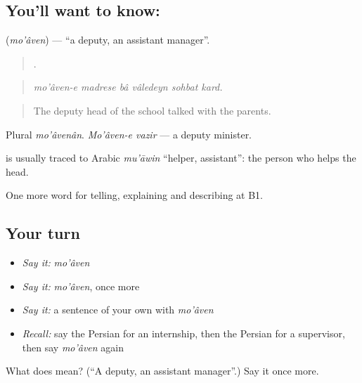 \subsection*{You'll want to know: }
\textbf{} (\emph{mo'âven}) — \textquotedblleft{}a deputy, an assistant manager\textquotedblright{}.

\begin{quote}
     .
\end{quote}

\begin{quote}
\emph{mo'âven-e madrese bâ vâledeyn sohbat kard.}
\end{quote}

\begin{quote}
The deputy head of the school talked with the parents.
\end{quote}

Plural \emph{mo'âvenân}. \emph{Mo'âven-e vazir} — a deputy minister.

\begin{cousinweb}
\textbf{} is usually traced to Arabic \emph{mu'āwin} \textquotedblleft{}helper, assistant\textquotedblright{}: the person who helps the head.
\end{cousinweb}

\begin{grammarlens}[title={What you've built}]
One more word for telling, explaining and describing at B1.
\end{grammarlens}

\subsection*{Your turn}
\begin{itemize}
\raggedright
  \item \emph{Say it:} \emph{mo'âven}
  \item \emph{Say it:} \emph{mo'âven}, once more
  \item \emph{Say it:} a sentence of your own with \emph{mo'âven}
  \item \emph{Recall:} say the Persian for an internship, then the Persian for a supervisor, then say \emph{mo'âven} again
\end{itemize}

\begin{tcolorbox}[breakable,colback=teal!4,colframe=teal!35!black,title={Before you move on}]
What does  mean? (\textquotedblleft{}A deputy, an assistant manager\textquotedblright{}.) Say it once more.
\end{tcolorbox}
